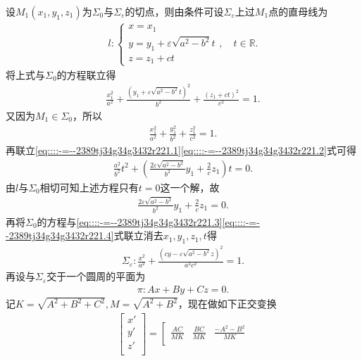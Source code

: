 \documentclass[../../main.tex]{subfiles}%
\begin{document}
\begin{solution}
设$M_1(x_1,y_1,z_1)$为$\Sigma_0$与$\Sigma_\varepsilon$的切点，则由条件可设$\Sigma_\varepsilon$上过$M_1$点的直母线为
\begin{align}
l:\begin{cases}
x=x_1\\
y=y_1+\varepsilon \sqrt{a^2-b^2}t\\
z=z_1+ct
\end{cases}, \quad t\in \mathbb{R}. \label{eq::::-=--2389tj34g34g3432r221.4}
\end{align}
将上式与$\Sigma_0$的方程联立得
\begin{align}
\frac{x_1^2}{a^2}+\frac{(y_1+\varepsilon \sqrt{a^2-b^2}t)^2}{b^2}+\frac{(z_1+ct)^2}{c^2}=1. \label{eq::::-=--2389tj34g34g3432r221.1}
\end{align}
又因为$M_1\in \Sigma_0$，所以
\begin{align}
\frac{x_1^2}{a^2}+\frac{y_1^2}{b^2}+\frac{z_1^2}{c^2}=1. \label{eq::::-=--2389tj34g34g3432r221.2}
\end{align}
再联立\eqref{eq::::-=--2389tj34g34g3432r221.1}\eqref{eq::::-=--2389tj34g34g3432r221.2}式可得
\begin{align*}
\frac{a^2}{b^2}t^2+\left( \frac{2\varepsilon \sqrt{a^2-b^2}}{b^2}y_1+\frac{2}{c}z_1 \right) t=0.
\end{align*}
由$l$与$\Sigma_0$相切可知上述方程只有$t=0$这一个解，故
\begin{align}
\frac{2\varepsilon \sqrt{a^2-b^2}}{b^2}y_1+\frac{2}{c}z_1=0. \label{eq::::-=--2389tj34g34g3432r221.3}
\end{align}
再将$\Sigma_0$的方程与\eqref{eq::::-=--2389tj34g34g3432r221.3}\eqref{eq::::-=--2389tj34g34g3432r221.4}式联立消去$x_1,y_1,z_1,t$得
\begin{align*}
\Sigma_\varepsilon:\frac{x^2}{a^2}+\frac{(cy-\varepsilon \sqrt{a^2-b^2}z)^2}{a^2c^2}=1.
\end{align*}
再设与$\Sigma_\varepsilon$交于一个圆周的平面为
\begin{align*}
\pi:Ax+By+Cz=0.
\end{align*}
记$K=\sqrt{A^2+B^2+C^2},M=\sqrt{A^2+B^2}$，现在做如下正交变换
\begin{align*}
\left[ \begin{array}{c}
x'\\
y'\\
z'\\
\end{array} \right] =\left[ \begin{matrix}
\frac{AC}{MK}&		\frac{BC}{MK}&		\frac{-A^2-B^2}{MK}\\

\end{matrix}
\end{align*}
\end{solution}
\end{document}
